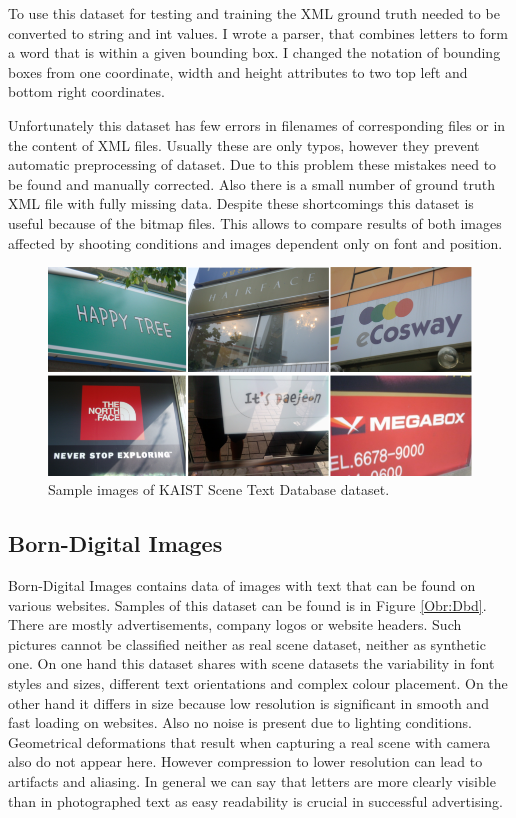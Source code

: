 To use this dataset for testing and training the XML ground truth needed to be converted to string and int values. I wrote a parser, that combines letters to form a word that is within a given bounding box. I changed the notation of bounding boxes from one coordinate, width and height attributes to two top left and bottom right coordinates.

Unfortunately this dataset has few errors in filenames of corresponding files or in the content of XML files. Usually these are only typos, however they prevent automatic preprocessing of dataset. Due to this problem these mistakes need to be found and  manually corrected. Also there is a small number of ground truth XML file with fully missing data. 
Despite these shortcomings this dataset is useful because of the bitmap files. This allows to compare results of both images affected by shooting conditions and images dependent only on font and position.

\begin{figure}[hbtp]
    \centering
    \includegraphics[scale=0.4]{obrazky/Dataset_kaist.png}
    \caption{Sample images of KAIST Scene Text Database dataset.}
    \label{Obr:Dkaist}
\end{figure}

\subsection{Born-Digital Images}

Born-Digital Images contains data of images with text that can be found on various websites. Samples of this dataset can be found is in Figure \ref*{Obr:Dbd}. There are mostly advertisements, company logos or website headers. Such pictures cannot be classified neither as real scene dataset, neither as synthetic one. On one hand  this dataset shares with scene datasets the variability in font styles and sizes, different text orientations and complex colour placement. On the other hand it differs in size because low resolution is significant in smooth and fast loading on websites. Also no noise is present due to lighting conditions. Geometrical deformations that result when capturing a real scene with camera also do not appear here. However compression to lower resolution can lead to artifacts and aliasing. In general we can say that letters are more clearly visible than in photographed text as easy readability is crucial in successful advertising.\cite{born-digital1}

